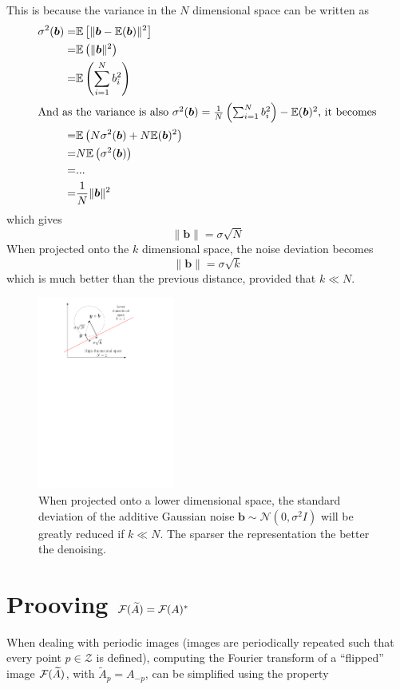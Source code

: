 This is because the variance in the $N$ dimensional space can be written as
\begin{align*}
\sigma^2(\bm{b}) =& \mathbb{E}\left[\lVert \bm{b}-\mathbb{E}(\bm{b}) \rVert^2 \right]\\
=& \mathbb{E}\left(\lVert \bm{b} \rVert^2 \right)\\
=& \mathbb{E}\left(\sum^N_{i=1} b_i^2 \right)\\
\shortintertext{And as the variance is also $\sigma^2(\bm{b})= \frac{1}{N}\left(\sum_{i=1}^N b_i^2 \right) - \mathbb{E}(\bm{b})^2$, it becomes}
=& \mathbb{E} \left(N\sigma^2(\bm{b}) + N\mathbb{E}(\bm{b})^2\right)\\
=& N \mathbb{E} \left(\sigma^2(\bm{b})\right)\\
=& ... \\
=& \frac{1}{N}\lVert \bm{b} \rVert^2
\end{align*}
which gives 
$$ \lVert \bm{b} \rVert = \sigma\sqrt{N} $$
When projected onto the $k$ dimensional space, the noise deviation becomes
$$\lVert \bm{b} \rVert = \sigma\sqrt{k} $$
which is much better than the previous distance, provided that $k \ll N$. 

\begin{figure}[!ht]\centering
\includegraphics[width=0.4\textwidth]{figures/sparse-reduce-noise.pdf}
\caption{When projected onto a lower dimensional space, the standard deviation of the additive Gaussian noise $\bm{b} \sim \mathcal{N}(0,\sigma^2I)$ will be greatly reduced if $k \ll N$. The sparser the representation the better the denoising. \label{sparse_reduce_noise}}
\end{figure}

\clearpage

\section{Prooving ${\mathcal F}(\widetilde{A}) = {\mathcal F}(A)^*$} \label{sec_proof_fourier_flip_adjoint}
When dealing with periodic images (images are periodically repeated such that every point $p \in \mathcal{Z}$ is defined), computing the Fourier transform of a “flipped” image ${\mathcal F}(\widetilde{A})$, with $\widetilde{A}_p = A_{-p}$, can be simplified using the property

